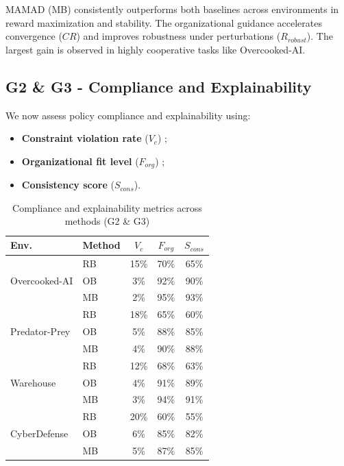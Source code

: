 \documentclass[pdflatex,sn-mathphys-num]{sn-jnl}%
\theoremstyle{thmstyleone}%
\theoremstyle{thmstyletwo}%
\theoremstyle{thmstylethree}%
\begin{document}
MAMAD (MB) consistently outperforms both baselines across environments in reward maximization and stability. The organizational guidance accelerates convergence ($CR$) and improves robustness under perturbations ($R_{robust}$). The largest gain is observed in highly cooperative tasks like Overcooked-AI.

\subsection{G2 \& G3 - Compliance and Explainability}

We now assess policy compliance and explainability using:

\begin{itemize}
    \item \textbf{Constraint violation rate} ($V_c$) ;
    \item \textbf{Organizational fit level} ($F_{org}$) ;
    \item \textbf{Consistency score} ($S_{cons}$).
\end{itemize}

\begin{table}[h!]
    \centering
    \caption{Compliance and explainability metrics across methods (G2 \& G3)}
    \begin{tabular}{l|l|ccc}
        \hline
        \textbf{Env.} & \textbf{Method} & $V_c$ & $F_{org}$ & $S_{cons}$ \\
        \hline
        \multirow{3}{*}{Overcooked-AI}
        & RB & 15\% & 70\% & 65\% \\
        & OB & 3\% & 92\% & 90\% \\
        & MB & 2\% & 95\% & 93\% \\
        \hline
        \multirow{3}{*}{Predator-Prey}
        & RB & 18\% & 65\% & 60\% \\
        & OB & 5\% & 88\% & 85\% \\
        & MB & 4\% & 90\% & 88\% \\
        \hline
        \multirow{3}{*}{Warehouse}
        & RB & 12\% & 68\% & 63\% \\
        & OB & 4\% & 91\% & 89\% \\
        & MB & 3\% & 94\% & 91\% \\
        \hline
        \multirow{3}{*}{CyberDefense}
        & RB & 20\% & 60\% & 55\% \\
        & OB & 6\% & 85\% & 82\% \\
        & MB & 5\% & 87\% & 85\% \\
        \hline
    \end{tabular}
    \label{tab:g2_g3_full}
\end{table}
\end{document}
